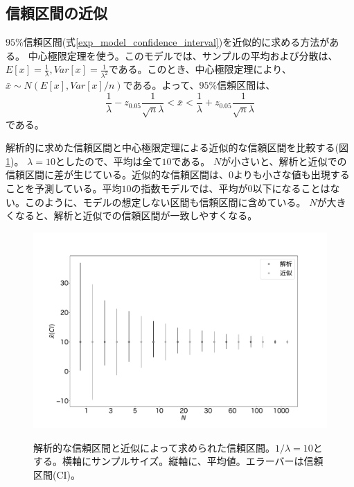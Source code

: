 \subsection{信頼区間の近似}
$95\%$信頼区間(式\ref{exp_model_confidence_interval})を近似的に求める方法がある。
中心極限定理を使う。このモデルでは、サンプルの平均および分散は、$E[x]=\frac{1}{\lambda},Var[x]=\frac{1}{\lambda^2}$である。このとき、中心極限定理により、$\bar{x}\sim N(E[x],Var[x]/n)$である。よって、$95\%$信頼区間は、
\begin{equation*}
\frac{1}{\lambda}-z_{0.05}\frac{1}{\sqrt{n}\lambda}<\bar{x}<\frac{1}{\lambda}+z_{0.05}\frac{1}{\sqrt{n}\lambda}
\end{equation*}
である。

解析的に求めた信頼区間と中心極限定理による近似的な信頼区間を比較する(図\ref{fig:model_predict_CI_interval})。
$\lambda=10$としたので、平均は全て$10$である。
$N$が小さいと、解析と近似での信頼区間に差が生じている。近似的な信頼区間は、$0$よりも小さな値も出現することを予測している。平均$10$の指数モデルでは、平均が$0$以下になることはない。このように、モデルの想定しない区間も信頼区間に含めている。
$N$が大きくなると、解析と近似での信頼区間が一致しやすくなる。

\begin{figure}
 \begin{center}
  \includegraphics[width=15cm]{./image/12_/confidence_expon_interval.pdf}
  \label{fig:model_predict_CI_interval}
  \caption{解析的な信頼区間と近似によって求められた信頼区間。$1/\lambda=10$とする。横軸にサンプルサイズ。縦軸に、平均値。エラーバーは信頼区間(CI)。}
 \end{center}
\end{figure}

